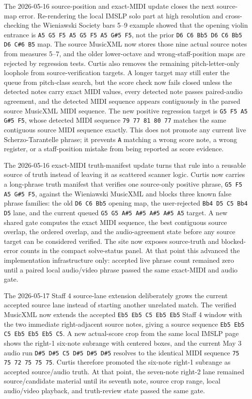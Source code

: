 \documentclass[12pt,letterpaper]{article}
\begin{document}
The 2026-05-16 source-position and exact-MIDI update closes the next source-map error. Re-rendering the local IMSLP solo part at high resolution and cross-checking the Wieniawski Society bars 5--9 example showed that the opening violin entrance is \texttt{A5 G5 F5 A5 G5 F5 A5 G\#5 F5}, not the prior \texttt{D6 C6 Bb5 D6 C6 Bb5 D6 C\#6 B5} map. The source MusicXML now stores those nine actual source notes from measures 5--7, and the older lower-octave and wrong-staff-position maps are rejected by regression tests. Curtis also removes the remaining pitch-letter-only loophole from source-verification targets. A longer target may still enter the queue from pitch-class search, but the score check now fails closed unless the detected notes carry exact MIDI values, every detected note passes paired-audio agreement, and the detected MIDI sequence appears contiguously in the parsed source MusicXML MIDI sequence. The new positive regression target is \texttt{G5 F5 A5 G\#5 F5}, whose detected MIDI sequence \texttt{79 77 81 80 77} matches the same contiguous source MIDI sequence exactly. This does not promote any current live Scherzo-Tarantelle phrase; it prevents \texttt{A} matching a wrong score note, a wrong register, or a staff-position mistake from being reported as score evidence.

The 2026-05-16 exact-MIDI truth-manifest update turns that rule into a reusable source of truth instead of leaving it as scattered scanner logic. Curtis now carries a long-phrase truth manifest that verifies one source-only positive phrase, \texttt{G5 F5 A5 G\#5 F5}, against the Wieniawski MusicXML and blocks three known false phrase families: the old \texttt{D6 C6 Bb5} opening map, the user-rejected \texttt{Bb4 D5 C5 Bb4 D5} lane, and the current queued \texttt{G5 G5 A\#5 A\#5 A\#5 A\#5 A5} target. A new shared gate computes the exact MIDI sequence, the best contiguous source overlap, the ordered overlap, and the audio-agreement state before any source target can be considered verified. The site now exposes source-truth and blocked-error counts in the compact solve-status panel. At that point this advanced the implementation infrastructure only: accepted live phrase count remained zero until a paired local audio/video phrase passed the same exact-MIDI and audio gate.

The 2026-05-17 Staff 4 source-lane extension deliberately grows the current accepted source lane instead of starting another unrelated match. The verified MusicXML now extends the accepted \texttt{Eb5 Eb5 C5 Eb5 Eb5} Staff 4 window with the two immediate right-adjacent source notes, giving a source sequence \texttt{Eb5 Eb5 C5 Eb5 Eb5 Eb5 C5}. A new actual-score crop from the same local IMSLP page shows the right-1 six-note subrange with centered boxes, and the current May 3 audio run \texttt{D\#5 D\#5 C5 D\#5 D\#5 D\#5} resolves to the identical MIDI sequence \texttt{75 75 72 75 75 75}. Curtis therefore promoted the six-note right-1 subrange as accepted source/audio truth. At that point, the seven-note right-2 lane remained source/candidate material until its seventh note, source crop range, local audio/video playback, and truth-review state passed the same gate.
\end{document}
